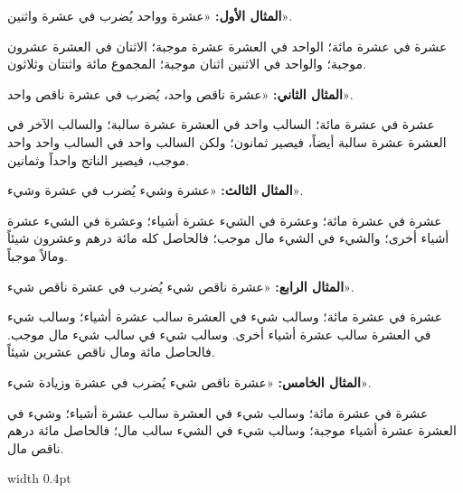 \documentclass[11pt,a4paper]{book}
\begin{document}
\noindent\begin{minipage}[t]{0.48\textwidth}
\raggedleft

\begin{Arabic}
\textbf{المثال الأول:} «عشرة وواحد يُضرب في عشرة واثنين».

عشرة في عشرة مائة؛ الواحد في العشرة عشرة موجبة؛ الاثنان في العشرة عشرون موجبة؛ والواحد في الاثنين اثنان موجبة؛ المجموع مائة واثنتان وثلاثون.

\textbf{المثال الثاني:} «عشرة ناقص واحد، يُضرب في عشرة ناقص واحد».

عشرة في عشرة مائة؛ السالب واحد في العشرة عشرة سالبة؛ والسالب الآخر في العشرة عشرة سالبة أيضاً، فيصير ثمانون؛ ولكن السالب واحد في السالب واحد واحد موجب، فيصير الناتج واحداً وثمانين.

\textbf{المثال الثالث:} «عشرة وشيء يُضرب في عشرة وشيء».

عشرة في عشرة مائة؛ وعشرة في الشيء عشرة أشياء؛ وعشرة في الشيء عشرة أشياء أخرى؛ والشيء في الشيء مال موجب؛ فالحاصل كله مائة درهم وعشرون شيئاً ومالاً موجباً.

\textbf{المثال الرابع:} «عشرة ناقص شيء يُضرب في عشرة ناقص شيء».

عشرة في عشرة مائة؛ وسالب شيء في العشرة سالب عشرة أشياء؛ وسالب شيء في العشرة سالب عشرة أشياء أخرى. وسالب شيء في سالب شيء مال موجب. فالحاصل مائة ومال ناقص عشرين شيئاً.

\textbf{المثال الخامس:} «عشرة ناقص شيء يُضرب في عشرة وزيادة شيء».

عشرة في عشرة مائة؛ وسالب شيء في العشرة سالب عشرة أشياء؛ وشيء في العشرة عشرة أشياء موجبة؛ وسالب شيء في الشيء سالب مال؛ فالحاصل مائة درهم ناقص مال.
\end{Arabic}

\end{minipage}%
\hfill\vrule width 0.4pt\hfill
\end{document}
